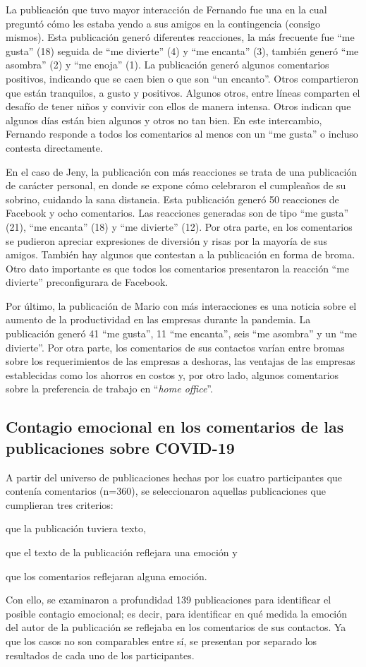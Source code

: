 \documentclass{textolivre}
\begin{document}
La publicación que tuvo mayor interacción de Fernando fue una en la cual preguntó cómo les estaba yendo a sus amigos en la contingencia (consigo mismos). Esta publicación generó diferentes reacciones, la más frecuente fue “me gusta” (18) seguida de “me divierte” (4) y “me encanta” (3), también generó “me asombra” (2) y “me enoja” (1). La publicación generó algunos comentarios positivos, indicando que se caen bien o que son “un encanto”. Otros compartieron que están tranquilos, a gusto y positivos. Algunos otros, entre líneas comparten el desafío de tener niños y convivir con ellos de manera intensa. Otros indican que algunos días están bien algunos y otros no tan bien. En este intercambio, Fernando responde a todos los comentarios al menos con un “me gusta” o incluso contesta directamente. 

En el caso de Jeny, la publicación con más reacciones se trata de una publicación de carácter personal, en donde se expone cómo celebraron el cumpleaños de su sobrino, cuidando la sana distancia. Esta publicación generó 50 reacciones de Facebook y ocho comentarios. Las reacciones generadas son de tipo “me gusta” (21), “me encanta” (18) y “me divierte” (12). Por otra parte, en los comentarios se pudieron apreciar expresiones de diversión y risas por la mayoría de sus amigos. También hay algunos que contestan a la publicación en forma de broma. Otro dato importante es que todos los comentarios presentaron la reacción “me divierte” preconfigurara de Facebook. 

Por último, la publicación de Mario con más interacciones es una noticia sobre el aumento de la productividad en las empresas durante la pandemia. La publicación generó 41 “me gusta”, 11 “me encanta”, seis “me asombra” y un “me divierte”. Por otra parte, los comentarios de sus contactos varían entre bromas sobre los requerimientos de las empresas a deshoras, las ventajas de las empresas establecidas como los ahorros en costos y, por otro lado, algunos comentarios sobre la preferencia de trabajo en “\textit{home office}”. 


\subsection{Contagio emocional en los comentarios de las publicaciones sobre COVID-19}
A partir del universo de publicaciones hechas por los cuatro participantes que contenía comentarios (n=360), se seleccionaron aquellas publicaciones que cumplieran tres criterios: 
\begin{enumerate*}[label=\arabic*)]
\item que la publicación tuviera texto, 
\item que el texto de la publicación reflejara una emoción y 
\item que los comentarios reflejaran alguna emoción.
\end{enumerate*}
Con ello, se examinaron a profundidad 139 publicaciones para identificar el posible contagio emocional; es decir, para identificar en qué medida la emoción del autor de la publicación se reflejaba en los comentarios de sus contactos.  Ya que los casos no son comparables entre sí, se presentan por separado los resultados de cada uno de los participantes. 
\end{document}
